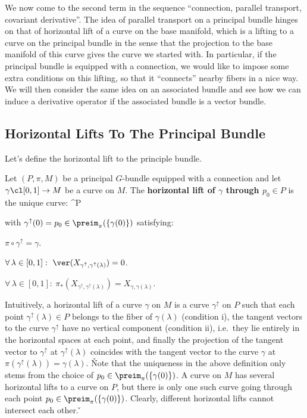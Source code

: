We now come to the second term in the sequence ``connection, parallel transport, covariant derivative''. The idea of
parallel transport on a principal bundle hinges on that of horizontal lift of a curve on the base manifold, which is
a lifting to a curve on the principal bundle in the sense that the projection to the base manifold of this curve
gives the curve we started with. In particular, if the principal bundle is equipped with a connection, we would like
to impose some extra conditions on this lifting, so that it ``connects'' nearby fibers in a nice way. We will then
consider the same idea on an associated bundle and see how we can induce a derivative operator if the associated
bundle is a vector bundle.

\subsection{Horizontal Lifts To The Principal Bundle}

Let's define the horizontal lift to the principle bundle.

Let $(P,\pi,M)$ be a principal $G$-bundle equipped with a connection and let $\gamma\cl[0,1]\to M$ be a curve on $M$.
The \textbf{horizontal lift of $\gamma$ through $p_0\in P$} is the unique curve:
\bse
\gamma^{\uparrow}\cl [0,1] \to P
\ese

with $\gamma^\uparrow(0)=p_0\in \preim_\pi(\{\gamma(0)\})$ satisfying:
\ben[label=\roman*)]
\item $\pi \circ \gamma^{\uparrow} = \gamma$.
\item $\forall \, \lambda\in [0,1] : \ \ver(X_{\gamma^{\uparrow}, \gamma^{\uparrow}(\lambda)})=0$.
\item $\forall \, \lambda\in [0,1] : \ \pi_*(X_{\gamma^{\uparrow}, \gamma^{\uparrow}(\lambda)})=X_{\gamma,\gamma (\lambda)}$.
\een
\ed

Intuitively, a horizontal lift of a curve $\gamma$ on $M$ is a curve $\gamma^\uparrow$ on $P$ such that each point
$\gamma^\uparrow(\lambda)\in P$ belongs to the fiber of $\gamma(\lambda)$ (condition i), the tangent vectors to the
curve $\gamma^\uparrow$ have no vertical component (condition ii), i.e.\ they lie entirely in the horizontal spaces
at each point, and finally the projection of the tangent vector to $\gamma^\uparrow$ at $\gamma^\uparrow(\lambda)$
coincides with the tangent vector to the curve $\gamma$ at $\pi (\gamma^\uparrow(\lambda))=\gamma(\lambda)$. \v

Note that the uniqueness in the above definition only stems from the choice of $p_0\in\preim_\pi(\{\gamma(0)\})$. A
curve on $M$ has several horizontal lifts to a curve on $P$, but there is only one such curve going through each
point $p_0\in\preim_\pi(\{\gamma(0)\})$. Clearly, different horizontal lifts cannot intersect each other. \v


